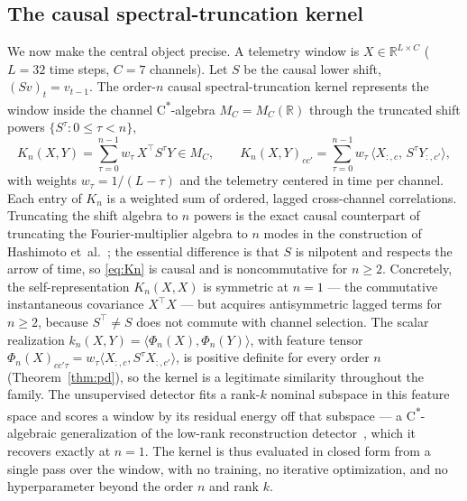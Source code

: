 \documentclass[
  aps,
  prresearch,
  reprint,
  amsmath,
  amssymb,
  nofootinbib,
  floatfix,
]{revtex4-2}
\newcommand{\Mc}{\ensuremath{M_C}}
\begin{document}
\begin{table}[t]
  \centering
  \small
  \caption{\textbf{Forecasting benchmark} (mean~$\pm$~s.d.\ over five
  telemetry-generator seeds). Skill is reported relative to persistence at the
  eight-step horizon; the best value per column is in \textbf{bold}. The
  multivariate ridge is the commutative ($n{=}1$) member of the kernel family and
  is best on every metric, attaining $72\%$ eight-step skill over persistence.}
  \label{tab:forecast}
  
\end{table}

\subsection{The causal spectral-truncation kernel}

We now make the central object precise. A telemetry window is
$X\in\mathbb{R}^{L\times C}$ ($L=32$ time steps, $C=7$ channels). Let $S$ be the
causal lower shift, $(Sv)_t=v_{t-1}$. The order-$n$ causal spectral-truncation
kernel represents the window inside the channel C\textsuperscript{$\ast$}-algebra
$\Mc=M_C(\mathbb{R})$ through the truncated shift powers $\{S^\tau:0\le\tau<n\}$,
\begin{equation}
  K_n(X,Y)=\sum_{\tau=0}^{n-1}w_\tau\,X^{\top}S^{\tau}Y\in\Mc,\qquad
  K_n(X,Y)_{cc'}=\sum_{\tau=0}^{n-1}w_\tau\,\langle X_{:,c},\,S^{\tau}Y_{:,c'}\rangle,
  \label{eq:Kn}
\end{equation}
with weights $w_\tau=1/(L-\tau)$ and the telemetry centered in time per channel.
Each entry of $K_n$ is a weighted sum of ordered, lagged cross-channel
correlations. Truncating the shift algebra to $n$ powers is the exact causal
counterpart of truncating the Fourier-multiplier algebra to $n$ modes in the
construction of Hashimoto et~al.~\citep{hashimoto2024spectral}; the essential
difference is that $S$ is nilpotent and respects the arrow of time, so
\eqref{eq:Kn} is causal and is noncommutative for $n\ge2$. Concretely, the
self-representation $K_n(X,X)$ is symmetric at $n{=}1$ --- the commutative
instantaneous covariance $X^{\top}X$ --- but acquires antisymmetric lagged terms for
$n\ge2$, because $S^{\top}\neq S$ does not commute with channel selection. The
scalar realization $k_n(X,Y)=\langle\Phi_n(X),\Phi_n(Y)\rangle$, with feature
tensor $\Phi_n(X)_{cc'\tau}=w_\tau\langle X_{:,c},S^{\tau}X_{:,c'}\rangle$, is
positive definite for every order $n$ (Theorem~\ref{thm:pd}), so the kernel is a
legitimate similarity throughout the family. The unsupervised detector fits a
rank-$k$ nominal subspace in this feature space and scores a window by its residual
energy off that subspace --- a C\textsuperscript{$\ast$}-algebraic generalization of
the low-rank reconstruction detector~\citep{malhotra2016lstmad}, which it recovers
exactly at $n{=}1$. The kernel is thus evaluated in closed form from a single pass
over the window, with no training, no iterative optimization, and no
hyperparameter beyond the order $n$ and rank $k$.
\end{document}
